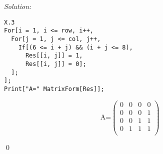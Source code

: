 \documentclass[12pt]{article}
\newenvironment{sol}
    {\emph{Solution:}
    }
    {
    \qed
    }
\begin{document}
\begin{sol}
\begin{lstlisting}
X.3
For[i = 1, i <= row, i++,
  For[j = 1, j <= col, j++,
    If[(6 <= i + j) && (i + j <= 8),
      Res[[i, j]] = 1,
      Res[[i, j]] = 0];
  ];
];
Print["A=" MatrixForm[Res]];
\end{lstlisting}
\begin{equation}
\text{A=} \left(
\begin{array}{cccc}
 0 & 0 & 0 & 0 \\
 0 & 0 & 0 & 1 \\
 0 & 0 & 1 & 1 \\
 0 & 1 & 1 & 1 \\
\end{array}
\right)
\end{equation}
\end{sol}
\end{document}
